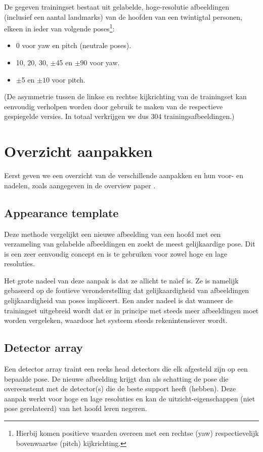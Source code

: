 \documentclass[a4paper,dutch,11pt,]{scrartcl}
\begin{document}
De gegeven trainingset bestaat uit gelabelde, hoge-resolutie afbeeldingen (inclusief een aantal landmarks) van de hoofden van een twintigtal personen, elkeen in ieder van volgende poses\footnote{Hierbij komen positieve waarden overeen met een rechtse (yaw) respectievelijk bovenwaartse (pitch) kijkrichting.}:
\begin{itemize}
 \item 0\textdegree{} voor yaw en pitch (neutrale poses).
 \item 10\textdegree{}, 20\textdegree{}, 30\textdegree{}, $\pm$45\textdegree{} en $\pm90$\textdegree{} voor yaw.
 \item $\pm$5\textdegree{} en $\pm10$\textdegree{} voor pitch.
\end{itemize}
(De asymmetrie tussen de linkse en rechtse kijkrichting van de trainingset kan eenvoudig verholpen worden door gebruik te maken van de respectieve gespiegelde versies. In totaal verkrijgen we dus $304$ trainingsafbeeldingen.) 


\section{Overzicht aanpakken}
Eerst geven we een overzicht van de verschillende aanpakken en hun voor- en nadelen, zoals aangegeven in de overview paper \cite{overview}.

\subsection{Appearance template}
Deze methode vergelijkt een nieuwe afbeelding van een hoofd met een verzameling van gelabelde afbeeldingen en zoekt de meest gelijkaardige pose. Dit is een zeer eenvoudig concept en is te gebruiken voor zowel hoge en lage resoluties. 

Het grote nadeel van deze aanpak is dat ze allicht te na\"{\i}ef is. Ze is namelijk gebaseerd op de foutieve veronderstelling dat gelijkaardigheid van afbeeldingen gelijkaardigheid van poses impliceert. Een ander nadeel is dat wanneer de trainingset uitgebreid wordt dat er in principe met steeds meer afbeeldingen moet worden vergeleken, waardoor het systeem steeds rekenintensiever wordt.

\subsection{Detector array} 
Een detector array traint een reeks head detectors die elk afgesteld zijn op een bepaalde pose.
De nieuwe afbeelding krijgt dan als schatting de pose die overeenstemt met de detector(s) die de beste support heeft (hebben). Deze aanpak werkt voor hoge en lage resoluties en kan de uitzicht-eigenschappen (niet pose gerelateerd) van het hoofd leren negeren.
\end{document}
